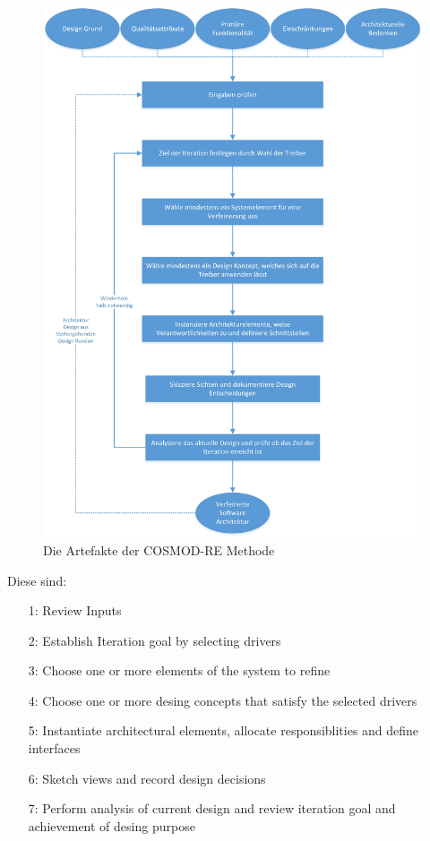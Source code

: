 \begin{figure}[h]
	\centering
	\includegraphics[scale=0.45]{add3.jpg} 
	\caption{Die Artefakte der COSMOD-RE Methode}\label{add3}
\end{figure}

Diese sind:
\begin{itemize}
\item[1:] Review Inputs
\item[2:] Establish Iteration goal by selecting drivers
\item[3:] Choose one or more elements of the system to refine
\item[4:] Choose one or more desing concepts that satisfy the selected drivers
\item[5:] Instantiate architectural elements, allocate responsiblities and define interfaces
\item[6:] Sketch views and record design decisions
\item[7:] Perform analysis of current design and review iteration goal and achievement of desing purpose\\
\end{itemize}

